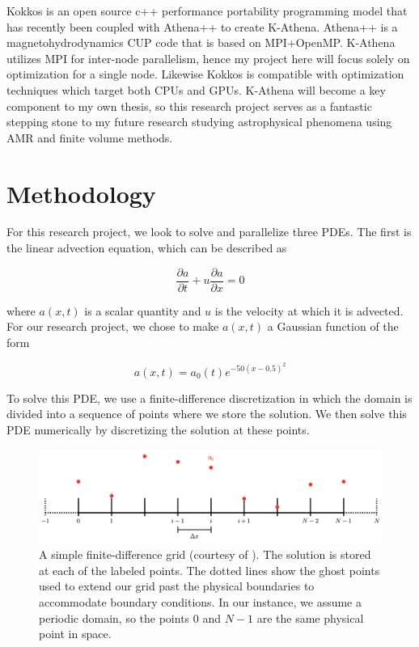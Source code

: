 \documentclass{article}
\begin{document}
Kokkos is an open source c++ performance portability programming model that has recently been coupled with Athena++ to create K-Athena.
Athena++ is a magnetohydrodynamics CUP code that is based on MPI+OpenMP.
K-Athena utilizes MPI for inter-node parallelism, hence my project here will focus solely on optimization for a single node.
Likewise Kokkos is compatible with optimization techniques which target both CPUs and GPUs.
K-Athena will become a key component to my own thesis, so this research project serves as a fantastic stepping stone to my future research studying astrophysical phenomena using AMR and finite volume methods.

\section{Methodology}

For this research project, we look to solve and parallelize three PDEs. The first is the linear advection equation, which can be described as 

\begin{equation}
 \frac{\partial a}{\partial t} + u \frac{\partial a}{\partial x} = 0
\end{equation}

where $a(x,t)$ is a scalar quantity and $u$ is the velocity at which it is advected. For our research project, we chose to make $a(x,t)$ a Gaussian function of the form 

\begin{equation}
a(x,t) = a_0(t) e^{- 50 (x - 0.5)^2 }
\end{equation}

To solve this PDE, we use a finite-difference discretization in which the domain is divided into a sequence of points where we store the solution. We then solve this PDE numerically by discretizing the solution at these points.





\begin{figure}[h]
\centering
\includegraphics[width=1.0\textwidth]{Finite_Difference_Grid.png}
\caption{A simple finite-difference grid (courtesy of \cite{zingale_2020}). The solution is stored at each of the labeled points. The dotted lines show the ghost points used to extend our grid past the physical boundaries to accommodate boundary conditions. In our instance, we assume a periodic domain, so the points $0$ and $N-1$ are the same physical point in space.}
\label{Finite_Difference_Grid}
\end{figure}
\end{document}
